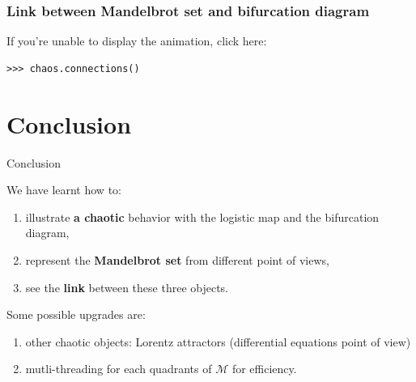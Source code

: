 \documentclass[11pt, compress, tikz]{beamer}
\theoremstyle{definition}
\begin{document}
\begin{frame}[fragile]
\frametitle{Link between Mandelbrot set and bifurcation diagram}
If you're unable to display the animation, click here:
\href{https://www.youtube.com/watch?v=xYQbqML1eE4}{}
\begin{verbatim}
>>> chaos.connections()
\end{verbatim}


\end{frame}

\section[]{Conclusion}
\begin{frame}{Conclusion}
\begin{center}
We have learnt how to:
\end{center}
\begin{box2}{
\begin{enumerate}[label=$\bullet$]
\item illustrate \textbf{a chaotic} behavior with the logistic map and the bifurcation diagram,
\item represent the \textbf{Mandelbrot set} from different point of views,
\item see the \textbf{link} between these three objects.
\end{enumerate}}
\end{box2}
\begin{center}
Some possible upgrades are:
\end{center}
\begin{box2}{
\begin{enumerate}[label=\ding{42}]
\item other chaotic objects: Lorentz attractors (differential equations point of view)
\item mutli-threading for each quadrants of $\mathcal{M}$ for efficiency.
\end{enumerate}}
\end{box2}
\end{frame}  
\end{document}
